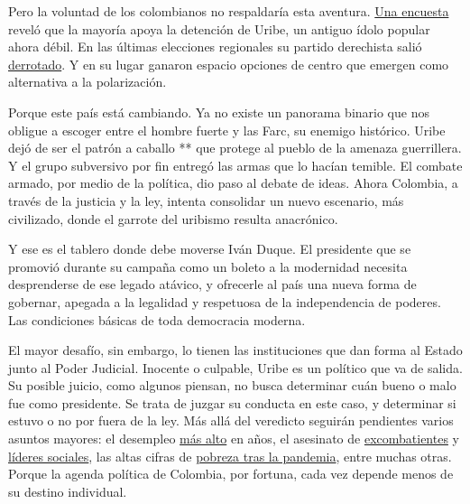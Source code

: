 Pero la voluntad de los colombianos no respaldaría esta aventura.
\href{https://www.elespectador.com/noticias/politica/el-64-de-los-colombianos-esta-de-acuerdo-con-la-detencion-de-uribe-datexco/}{Una
encuesta} reveló que la mayoría apoya la detención de Uribe, un antiguo
ídolo popular ahora débil. En las últimas elecciones regionales su
partido derechista salió
\href{https://www.elespectador.com/noticias/politica/uribe-el-gran-derrotado-en-las-elecciones-regionales-2019/}{derrotado}.
Y en su lugar ganaron espacio opciones de centro que emergen como
alternativa a la polarización.

Porque este país está cambiando. Ya no existe un panorama binario que
nos obligue a escoger entre el hombre fuerte y las Farc, su enemigo
histórico. Uribe dejó de ser el patrón a caballo ** que protege al
pueblo de la amenaza guerrillera. Y el grupo subversivo por fin entregó
las armas que lo hacían temible. El combate armado, por medio de la
política, dio paso al debate de ideas. Ahora Colombia, a través de la
justicia y la ley, intenta consolidar un nuevo escenario, más
civilizado, donde el garrote del uribismo resulta anacrónico.

Y ese es el tablero donde debe moverse Iván Duque. El presidente que se
promovió durante su campaña como un boleto a la modernidad necesita
desprenderse de ese legado atávico, y ofrecerle al país una nueva forma
de gobernar, apegada a la legalidad y respetuosa de la independencia de
poderes. Las condiciones básicas de toda democracia moderna.

El mayor desafío, sin embargo, lo tienen las instituciones que dan forma
al Estado junto al Poder Judicial. Inocente o culpable, Uribe es un
político que va de salida. Su posible juicio, como algunos piensan, no
busca determinar cuán bueno o malo fue como presidente. Se trata de
juzgar su conducta en este caso, y determinar si estuvo o no por fuera
de la ley. Más allá del veredicto seguirán pendientes varios asuntos
mayores: el desempleo
\href{https://www.dane.gov.co/index.php/estadisticas-por-tema/mercado-laboral/empleo-y-desempleo}{más
alto} en años, el asesinato de
\href{https://www.elespectador.com/colombia2020/pais/farc-denuncia-que-200-excombatientes-han-sido-asesinados/}{excombatientes}
y
\href{https://www.elespectador.com/colombia2020/pais/despues-del-acuerdo-de-paz-el-52-de-los-lideres-sociales-fueron-asesinados-en-este-gobierno/}{líderes
sociales}, las altas cifras de
\href{https://elpais.com/internacional/2020-07-17/el-impacto-economico-de-la-pandemia-frena-el-optimismo-por-la-reduccion-de-la-pobreza-en-colombia.html}{pobreza
tras la pandemia}, entre muchas otras. Porque la agenda política de
Colombia, por fortuna, cada vez depende menos de su destino individual.

